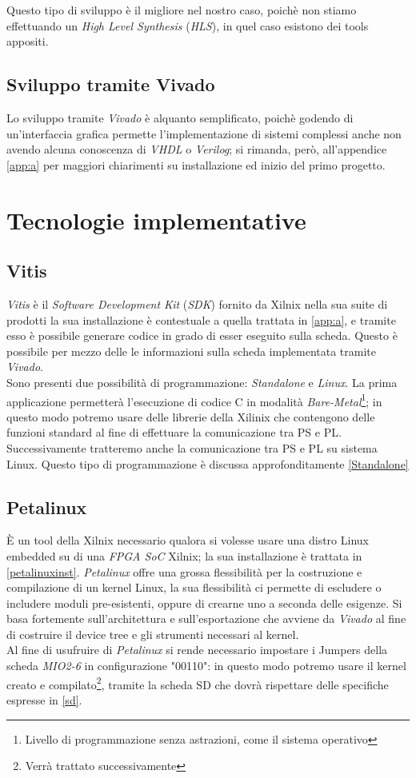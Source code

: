 Questo tipo di sviluppo è il migliore nel nostro caso, poichè non stiamo effettuando un \textit{High Level Synthesis} (\textit{HLS}), in quel caso esistono dei tools appositi.
\subsection{Sviluppo tramite Vivado}
Lo sviluppo tramite \textit{Vivado} è alquanto semplificato, poichè godendo di un'interfaccia grafica permette l'implementazione di sistemi complessi anche non avendo alcuna conoscenza di \textit{VHDL} o \textit{Verilog}; si rimanda, però, all'appendice \ref{app:a} per maggiori chiarimenti su installazione ed inizio del primo progetto.
\section{Tecnologie implementative}
\subsection{Vitis}
\textit{Vitis} è il \textit{Software Development Kit} (\textit{SDK}) fornito da Xilnix nella sua suite di prodotti la sua installazione è contestuale a quella trattata in \ref{app:a}, e tramite esso è possibile generare codice  in grado di esser eseguito sulla scheda. Questo è possibile per mezzo delle le informazioni sulla scheda implementata tramite \textit{Vivado}.\\
Sono presenti due possibilità di programmazione: \textit{Standalone} e \textit{Linux}. La prima applicazione permetterà l'esecuzione di codice C in modalità \textit{Bare-Metal}\footnote{Livello di programmazione senza astrazioni, come il sistema operativo}; in questo modo potremo usare delle librerie della Xilinix che contengono delle funzioni standard al fine di effettuare la comunicazione tra PS e PL. Successivamente tratteremo anche la comunicazione tra PS e PL su sistema Linux. Questo tipo di programmazione è discussa approfonditamente \ref{Standalone}
\subsection{Petalinux}
È un tool della Xilnix necessario qualora si volesse usare una distro Linux embedded su di una \textit{FPGA SoC} Xilnix; la sua installazione è trattata in \ref{petalinuxinst}. \textit{Petalinux} offre una grossa flessibilità per la costruzione e compilazione di un kernel Linux, la sua flessibilità ci permette di escludere o includere moduli pre-esistenti, oppure di crearne uno a seconda delle esigenze. Si basa fortemente sull'architettura e sull'esportazione che avviene da \textit{Vivado} al fine di costruire il device tree e gli strumenti necessari al kernel.\\
Al fine di usufruire di \textit{Petalinux} si rende necessario impostare i Jumpers della scheda \textit{MIO2-6} in configurazione  "00110": in questo modo potremo usare il kernel creato e compilato\footnote{Verrà trattato successivamente}, tramite la scheda SD che dovrà rispettare delle specifiche espresse in \ref{sd}.
